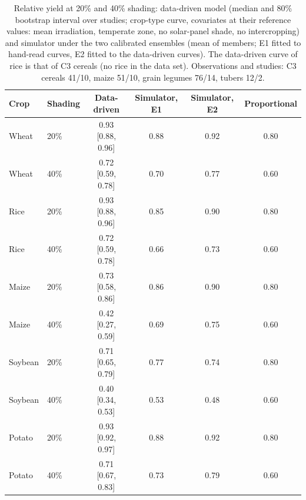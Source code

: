 \begin{table}[t]
\centering\small
\caption{Relative yield at 20\% and 40\% shading: data-driven model (median and 80\% bootstrap interval over studies; crop-type curve, covariates at their reference values: mean irradiation, temperate zone, no solar-panel shade, no intercropping) and simulator under the two calibrated ensembles (mean of members; E1 fitted to hand-read curves, E2 fitted to the data-driven curves). The data-driven curve of rice is that of C3 cereals (no rice in the data set). Observations and studies: C3 cereals 41/10, maize 51/10, grain legumes 76/14, tubers 12/2.}\label{tab:mlcurves}
\begin{tabular}{llcccc}
\toprule
Crop & Shading & Data-driven & Simulator, E1 & Simulator, E2 & Proportional\\
\midrule
Wheat & 20\% & 0.93 [0.88, 0.96] & 0.88 & 0.92 & 0.80\\
Wheat & 40\% & 0.72 [0.59, 0.78] & 0.70 & 0.77 & 0.60\\
Rice & 20\% & 0.93 [0.88, 0.96] & 0.85 & 0.90 & 0.80\\
Rice & 40\% & 0.72 [0.59, 0.78] & 0.66 & 0.73 & 0.60\\
Maize & 20\% & 0.73 [0.58, 0.86] & 0.86 & 0.90 & 0.80\\
Maize & 40\% & 0.42 [0.27, 0.59] & 0.69 & 0.75 & 0.60\\
Soybean & 20\% & 0.71 [0.65, 0.79] & 0.77 & 0.74 & 0.80\\
Soybean & 40\% & 0.40 [0.34, 0.53] & 0.53 & 0.48 & 0.60\\
Potato & 20\% & 0.93 [0.92, 0.97] & 0.88 & 0.92 & 0.80\\
Potato & 40\% & 0.71 [0.67, 0.83] & 0.73 & 0.79 & 0.60\\
\bottomrule
\end{tabular}
\end{table}
